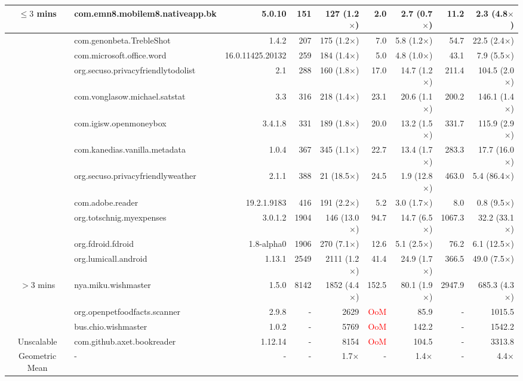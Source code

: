 \documentclass{article}
\begin{document}
\begin{table*}
\begin{adjustbox}{angle=90, max height=\textheight}
\begin{tabular}{c|l|r|r|r|r|r|r|r}
\multirow{-13}{*}{$\leq 3$ mins} &com.emn8.mobilem8.nativeapp.bk&5.0.10&151&127 (1.2$\times$)&2.0&2.7 (0.7$\times$)&11.2&2.3 (4.8$\times$)\\ \hline \hline
& com.genonbeta.TrebleShot&1.4.2&207&175 (1.2$\times$)&7.0&5.8 (1.2$\times$)&54.7&22.5 (2.4$\times$)\\ \cline{2-9}
& com.microsoft.office.word&16.0.11425.20132&259&184 (1.4$\times$)&5.0&4.8 (1.0$\times$)&43.1&7.9 (5.5$\times$)\\ \cline{2-9}
& org.secuso.privacyfriendlytodolist&2.1&288&160 (1.8$\times$)&17.0&14.7 (1.2$\times$)&211.4&104.5 (2.0$\times$)\\ \cline{2-9}
& com.vonglasow.michael.satstat&3.3&316&218 (1.4$\times$)&23.1&20.6 (1.1$\times$)&200.2&146.1 (1.4$\times$)\\ \cline{2-9}
& com.igisw.openmoneybox&3.4.1.8&331&189 (1.8$\times$)&20.0&13.2 (1.5$\times$)&331.7&115.9 (2.9$\times$)\\ \cline{2-9}
& com.kanedias.vanilla.metadata&1.0.4&367&345 (1.1$\times$)&22.7&13.4 (1.7$\times$)&283.3&17.7 (16.0$\times$)\\ \cline{2-9}
& org.secuso.privacyfriendlyweather&2.1.1&388&21 (18.5$\times$)&24.5&1.9 (12.8$\times$)&463.0&5.4 (86.4$\times$)\\ \cline{2-9}
& com.adobe.reader&19.2.1.9183&416&191 (2.2$\times$)&5.2&3.0 (1.7$\times$)&8.0&0.8 (9.5$\times$)\\ \cline{2-9}
& org.totschnig.myexpenses&3.0.1.2&1904&146 (13.0$\times$)&94.7&14.7 (6.5$\times$)&1067.3&32.2 (33.1$\times$)\\ \cline{2-9}
& org.fdroid.fdroid&1.8-alpha0&1906&270 (7.1$\times$)&12.6&5.1 (2.5$\times$)&76.2&6.1 (12.5$\times$)\\ \cline{2-9}
& org.lumicall.android&1.13.1&2549&2111 (1.2$\times$)&41.4&24.9 (1.7$\times$)&366.5&49.0 (7.5$\times$)\\ \cline{2-9}
\multirow{-12}{*}{$> 3$ mins} &nya.miku.wishmaster&1.5.0&8142&1852 (4.4$\times$)&152.5&80.1 (1.9$\times$)&2947.9&685.3 (4.3$\times$)\\ \hline \hline
& org.openpetfoodfacts.scanner&2.9.8&-&2629&\textcolor{red}{OoM}&85.9&-&1015.5\\ \cline{2-9}
& bus.chio.wishmaster&1.0.2&-&5769&\textcolor{red}{OoM}&142.2&-&1542.2\\ \cline{2-9}
\multirow{-3}{*}{Unscalable} &com.github.axet.bookreader&1.12.14&-&8154&\textcolor{red}{OoM}&104.5&-&3313.8\\ \hline \hline
Geometric Mean&-&-&-&1.7$\times$&-&1.4$\times$&-&4.4$\times$\\ \hline
\end{tabular}
\end{adjustbox}
\end{table*}
\end{document}
